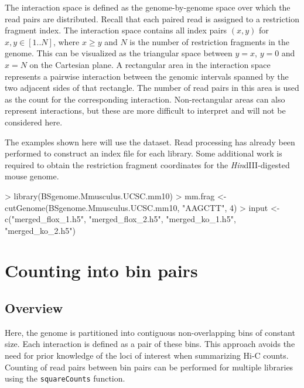 \documentclass[12pt]{report}
\renewenvironment{Schunk}{\vspace{0pt}}{\vspace{0pt}}
\newcommand{\code}[1]{{\small\texttt{#1}}}
\begin{document}
The interaction space is defined as the genome-by-genome space over which the read pairs are distributed.
Recall that each paired read is assigned to a restriction fragment index.
The interaction space contains all index pairs $(x, y)$ for $x, y \in [1 .. N]$, where $x \ge y$ and $N$ is the number of restriction fragments in the genome.
This can be visualized as the triangular space between $y=x$, $y=0$ and $x=N$ on the Cartesian plane.
A rectangular area in the interaction space represents a pairwise interaction between the genomic intervals spanned by the two adjacent sides of that rectangle.
The number of read pairs in this area is used as the count for the corresponding interaction.
Non-rectangular areas can also represent interactions, but these are more difficult to interpret and will not be considered here.

The examples shown here will use the \citeauthor{sofueva2013cohesin} dataset.
Read processing has already been performed to construct an index file for each library.
Some additional work is required to obtain the restriction fragment coordinates for the \textit{Hin}dIII-digested mouse genome.

\begin{Schunk}
\begin{Sinput}
> library(BSgenome.Mmusculus.UCSC.mm10)
> mm.frag <- cutGenome(BSgenome.Mmusculus.UCSC.mm10, "AAGCTT", 4)
> input <- c("merged_flox_1.h5", "merged_flox_2.h5", "merged_ko_1.h5", "merged_ko_2.h5")
\end{Sinput}
\end{Schunk}

\section{Counting into bin pairs}

\subsection{Overview}
Here, the genome is partitioned into contiguous non-overlapping bins of constant size.
Each interaction is defined as a pair of these bins.
This approach avoids the need for prior knowledge of the loci of interest when summarizing Hi-C counts.
Counting of read pairs between bin pairs can be performed for multiple libraries using the \code{squareCounts} function.
\end{document}
